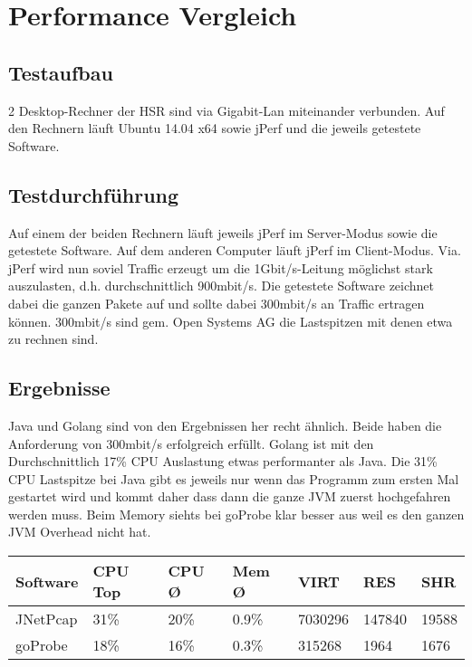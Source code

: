 \section{Performance Vergleich}
\label{sec:Performance Vergleich}

\subsection{Testaufbau}
2 Desktop-Rechner der HSR sind via Gigabit-Lan miteinander verbunden. Auf den Rechnern läuft Ubuntu 14.04 x64 sowie jPerf und die jeweils getestete Software.


\subsection{Testdurchführung}
Auf einem der beiden Rechnern läuft jeweils jPerf im Server-Modus sowie die getestete Software. Auf dem anderen Computer läuft jPerf im Client-Modus.
Via. jPerf wird nun soviel Traffic erzeugt um die 1Gbit/s-Leitung möglichst stark auszulasten, d.h. durchschnittlich 900mbit/s. Die getestete Software zeichnet dabei die ganzen Pakete auf und sollte dabei 300mbit/s an Traffic ertragen können. 300mbit/s sind gem. Open Systems AG die Lastspitzen mit denen etwa zu rechnen sind.

\subsection{Ergebnisse}
Java und Golang sind von den Ergebnissen her recht ähnlich. Beide haben die Anforderung von 300mbit/s erfolgreich erfüllt. Golang ist mit den Durchschnittlich 17\% CPU Auslastung etwas performanter als Java. Die 31\% CPU Lastspitze bei Java gibt es jeweils nur wenn das Programm zum ersten Mal gestartet wird und kommt daher dass dann die ganze \acs{JVM} zuerst hochgefahren werden muss.
Beim Memory siehts bei goProbe klar besser aus weil es den ganzen \acs{JVM} Overhead nicht hat.

\begin{table}[h]
\begin{tabular}{|l|l|l|l|l|l|l|}
\hline
\rowcolor[HTML]{C0C0C0} 
\textbf{Software} & \textbf{CPU Top} & \textbf{CPU Ø} & \textbf{Mem Ø} & \textbf{VIRT} & \textbf{RES} & \textbf{SHR} \\ \hline
JNetPcap          & 31\%             & 20\%           & 0.9\%          & 7030296       & 147840       & 19588        \\ \hline
goProbe           & 18\%             & 16\%           & 0.3\%          & 315268        & 1964         & 1676         \\ \hline
\end{tabular}
\end{table}
